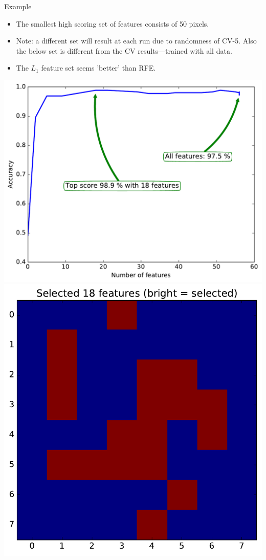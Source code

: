 \documentclass[10pt, aspectratio=169]{beamer} %
\begin{document}
\begin{frame}{Example}
\begin{itemize}
\item The smallest high scoring set of features consists of 50 pixels.
\item Note: a different set will result at each run due to randomness of CV-5. Also the below set is different from the CV results---trained with all data.
\item The $L_1$ feature set seems 'better' than RFE.
\end{itemize}
\begin{center}
	\includegraphics[height=0.4\textheight]{L1_digits_accuracy.pdf}
\qquad
\includegraphics[height=0.4\textheight]{L1_digits_mask.pdf}
\end{center}
\end{frame}
\end{document}
